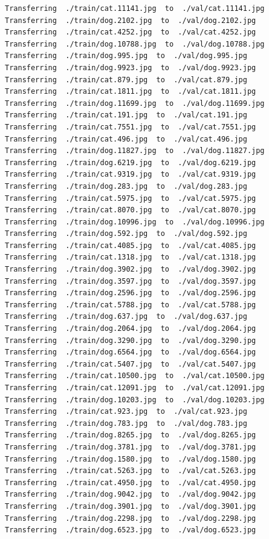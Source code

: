 \documentclass[]{book}
\theoremstyle{definition}
\theoremstyle{definition}
\theoremstyle{definition}
\theoremstyle{remark}
\begin{document}
\begin{verbatim}
Transferring  ./train/cat.11141.jpg  to  ./val/cat.11141.jpg
Transferring  ./train/dog.2102.jpg  to  ./val/dog.2102.jpg
Transferring  ./train/cat.4252.jpg  to  ./val/cat.4252.jpg
Transferring  ./train/dog.10788.jpg  to  ./val/dog.10788.jpg
Transferring  ./train/dog.995.jpg  to  ./val/dog.995.jpg
Transferring  ./train/dog.9923.jpg  to  ./val/dog.9923.jpg
Transferring  ./train/cat.879.jpg  to  ./val/cat.879.jpg
Transferring  ./train/cat.1811.jpg  to  ./val/cat.1811.jpg
Transferring  ./train/dog.11699.jpg  to  ./val/dog.11699.jpg
Transferring  ./train/cat.191.jpg  to  ./val/cat.191.jpg
Transferring  ./train/cat.7551.jpg  to  ./val/cat.7551.jpg
Transferring  ./train/cat.496.jpg  to  ./val/cat.496.jpg
Transferring  ./train/dog.11827.jpg  to  ./val/dog.11827.jpg
Transferring  ./train/dog.6219.jpg  to  ./val/dog.6219.jpg
Transferring  ./train/cat.9319.jpg  to  ./val/cat.9319.jpg
Transferring  ./train/dog.283.jpg  to  ./val/dog.283.jpg
Transferring  ./train/cat.5975.jpg  to  ./val/cat.5975.jpg
Transferring  ./train/cat.8070.jpg  to  ./val/cat.8070.jpg
Transferring  ./train/dog.10996.jpg  to  ./val/dog.10996.jpg
Transferring  ./train/dog.592.jpg  to  ./val/dog.592.jpg
Transferring  ./train/cat.4085.jpg  to  ./val/cat.4085.jpg
Transferring  ./train/cat.1318.jpg  to  ./val/cat.1318.jpg
Transferring  ./train/dog.3902.jpg  to  ./val/dog.3902.jpg
Transferring  ./train/dog.3597.jpg  to  ./val/dog.3597.jpg
Transferring  ./train/dog.2596.jpg  to  ./val/dog.2596.jpg
Transferring  ./train/cat.5788.jpg  to  ./val/cat.5788.jpg
Transferring  ./train/dog.637.jpg  to  ./val/dog.637.jpg
Transferring  ./train/dog.2064.jpg  to  ./val/dog.2064.jpg
Transferring  ./train/dog.3290.jpg  to  ./val/dog.3290.jpg
Transferring  ./train/dog.6564.jpg  to  ./val/dog.6564.jpg
Transferring  ./train/cat.5407.jpg  to  ./val/cat.5407.jpg
Transferring  ./train/cat.10500.jpg  to  ./val/cat.10500.jpg
Transferring  ./train/cat.12091.jpg  to  ./val/cat.12091.jpg
Transferring  ./train/dog.10203.jpg  to  ./val/dog.10203.jpg
Transferring  ./train/cat.923.jpg  to  ./val/cat.923.jpg
Transferring  ./train/dog.783.jpg  to  ./val/dog.783.jpg
Transferring  ./train/dog.8265.jpg  to  ./val/dog.8265.jpg
Transferring  ./train/dog.3781.jpg  to  ./val/dog.3781.jpg
Transferring  ./train/dog.1580.jpg  to  ./val/dog.1580.jpg
Transferring  ./train/cat.5263.jpg  to  ./val/cat.5263.jpg
Transferring  ./train/cat.4950.jpg  to  ./val/cat.4950.jpg
Transferring  ./train/dog.9042.jpg  to  ./val/dog.9042.jpg
Transferring  ./train/dog.3901.jpg  to  ./val/dog.3901.jpg
Transferring  ./train/dog.2298.jpg  to  ./val/dog.2298.jpg
Transferring  ./train/dog.6523.jpg  to  ./val/dog.6523.jpg

\end{verbatim}
\end{document}
